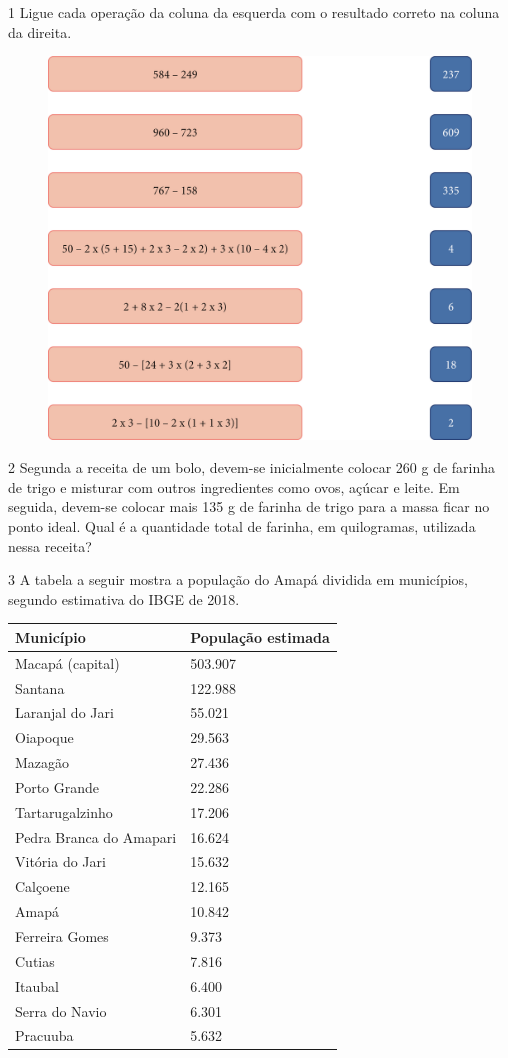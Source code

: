 \num{1} Ligue cada operação da coluna da esquerda com o resultado correto na
coluna da direita.

\begin{figure}[htpb!]
\centering
\includegraphics[width=\textwidth]{media/image14.png}
\end{figure}

\num{2} Segunda a receita de um bolo, devem-se inicialmente colocar 260 g de farinha
de trigo e misturar com outros ingredientes como ovos, açúcar e leite.
Em seguida, devem-se colocar mais 135 g de farinha de trigo para a massa
ficar no ponto ideal. Qual é a quantidade total de farinha, em quilogramas,
utilizada nessa receita?

\begin{mdframed}[linewidth=2pt,linecolor=salmao,roundcorner=2pt]
\vspace{3cm}
\end{mdframed}

\num{3} A tabela a seguir mostra a população do Amapá dividida em municípios, segundo estimativa do IBGE de 2018.

\begin{longtable}[]{@{}ll@{}}
\toprule
Município & População estimada\tabularnewline
\midrule
\endhead
Macapá (capital) & 503.907\tabularnewline
Santana & 122.988\tabularnewline
Laranjal do Jari & 55.021\tabularnewline
Oiapoque & 29.563\tabularnewline
Mazagão & 27.436\tabularnewline
Porto Grande & 22.286\tabularnewline
Tartarugalzinho & 17.206\tabularnewline
Pedra Branca do Amapari & 16.624\tabularnewline
Vitória do Jari & 15.632\tabularnewline
Calçoene & 12.165\tabularnewline
Amapá & 10.842\tabularnewline
Ferreira Gomes & 9.373\tabularnewline
Cutias & 7.816\tabularnewline
Itaubal & 6.400\tabularnewline
Serra do Navio & 6.301\tabularnewline
Pracuuba & 5.632\tabularnewline
\bottomrule
\end{longtable}

